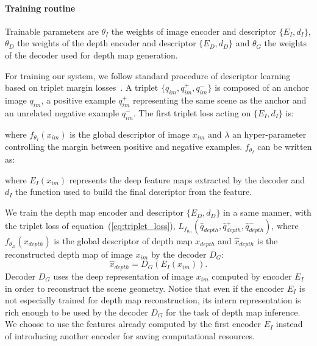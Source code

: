 \paragraph{Training routine}
\label{subsec:training}
Trainable parameters are $\theta_{I}$ the weights of image encoder and descriptor $\{E_I, d_I\}$, $\theta_{D}$ the weights of the depth encoder and descriptor $\{E_D, d_D\}$ and $\theta_{G}$ the weights of the decoder used for depth map generation. 

For training our system, we follow standard procedure of descriptor learning based on triplet margin losses~\cite{Arandjelovic2017}. A triplet $\{q_{im}, q_{im}^+, q_{im}^-\}$ is composed of an anchor image $q_{im}$, a positive example $q_{im}^+$ representing the same scene as the anchor and an unrelated negative example $q_{im}^-$.
The first triplet loss acting on $\{E_I, d_I\}$ is:

where $f_{\theta_{I}}(x_{im})$ is the global descriptor of image $x_{im}$ and $\lambda$ an hyper-parameter controlling the margin between positive and negative examples. $f_{\theta_{I}}$ can be written as:

where $E_I(x_{im})$ represents the deep feature maps extracted by the decoder and $d_I$ the function used to build the final descriptor from the feature.

We train the depth map encoder and descriptor $\{E_D, d_D\}$ in a same manner, with the triplet loss of equation~(\ref{eq:triplet_loss}), $L_{f_{\theta_{D}}}(\hat{q}_{depth}, \hat{q}_{depth}^+, \hat{q}_{depth}^-)$, where $f_{\theta_{D}}(x_{depth})$ is the global descriptor of depth map $x_{depth}$ and $\hat{x}_{depth}$ is the reconstructed depth map of image $x_{im}$ by the decoder $D_G$:
\begin{equation}
\label{eq:generator}
\hat{x}_{depth} = D_G(E_I(x_{im})).
\end{equation}
Decoder $D_G$ uses the deep representation of image $x_{im}$ computed by encoder $E_I$ in order to reconstruct the scene geometry. Notice that even if the encoder $E_I$ is not especially trained for depth map reconstruction, its intern representation is rich enough to be used by the decoder $D_G$ for the task of depth map inference. We choose to use the features already computed by the first encoder $E_I$ instead of introducing another encoder for saving computational resources.

